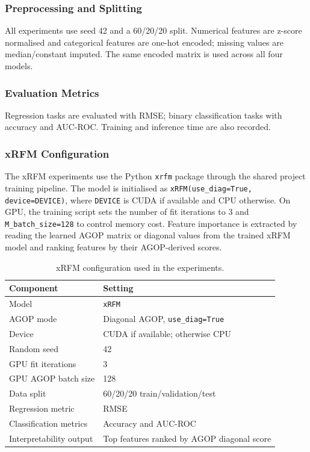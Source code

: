 \subsubsection{Preprocessing and Splitting}

All experiments use seed 42 and a 60/20/20 split. Numerical features are z-score normalised and categorical features are one-hot encoded; missing values are median/constant imputed. The same encoded matrix is used across all four models.

\subsubsection{Evaluation Metrics}

Regression tasks are evaluated with RMSE; binary classification tasks with accuracy and AUC-ROC. Training and inference time are also recorded.

\subsubsection{xRFM Configuration}
\label{sec:xrfm-config}

The xRFM experiments use the Python \texttt{xrfm} package through the shared project training pipeline. The model is initialised as \texttt{xRFM(use\_diag=True, device=DEVICE)}, where \texttt{DEVICE} is CUDA if available and CPU otherwise. On GPU, the training script sets the number of fit iterations to $3$ and \texttt{M\_batch\_size=128} to control memory cost. Feature importance is extracted by reading the learned AGOP matrix or diagonal values from the trained xRFM model and ranking features by their AGOP-derived scores.

\begin{table}[H]
  \centering
  \caption{xRFM configuration used in the experiments.}
  \label{tab:xrfm-config}
  \begin{tabular}{ll}
    \toprule
    Component & Setting \\
    \midrule
    Model & \texttt{xRFM} \\
    AGOP mode & Diagonal AGOP, \texttt{use\_diag=True} \\
    Device & CUDA if available; otherwise CPU \\
    Random seed & 42 \\
    GPU fit iterations & 3 \\
    GPU AGOP batch size & 128 \\
    Data split & 60/20/20 train/validation/test \\
    Regression metric & RMSE \\
    Classification metrics & Accuracy and AUC-ROC \\
    Interpretability output & Top features ranked by AGOP diagonal score \\
    \bottomrule
  \end{tabular}
\end{table}

